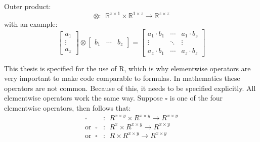 \documentclass[
  oneside]{book}
\begin{document}
Outer product:
\[\otimes: \ \ \mathbb{R}^{z \times 1} \times \mathbb{R}^{1 \times z} \rightarrow \mathbb{R}^{z \times z} \]
with an example:
\[
\begin{bmatrix}a_{1}\\ \vdots \\ a_{z}\end{bmatrix}
\otimes
\begin{bmatrix}b_{1} &\cdots  & b_{z}\end{bmatrix}
=
\begin{bmatrix}a_{1} \cdot b_{1} &\cdots  & a_{1} \cdot b_{z} \\ \vdots & \ddots & \vdots  \\ a_{z} \cdot b_{1}  & \cdots & a_{z} \cdot b_{z} \end{bmatrix}
\]

This thesis is specified for the use of R, which is why elementwise operators are very important to make code comparable to formulas. In mathematics these operators are not common. Because of this, it needs to be specified explicitly. All elementwise operators work the same way. Suppose \(\square\) is one of the four elementwise operators, then follows that:
\begin{align*}
\square &: \ \ R^{x \times y} \times R^{x \times y}  \rightarrow R^{x \times y}\\
\text{or }\ \square &: \ \ R^{x} \times R^{x \times y}  \rightarrow R^{x \times y}\\
\text{or }\ \square &: \ \ R \times R^{x \times y}  \rightarrow R^{x \times y}
\end{align*}
\end{document}
